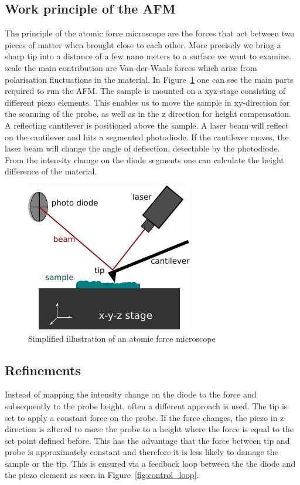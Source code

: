 \documentclass[paper=a4,fontsize=10pt,DIV=18,twocolumn,parskip=half]{scrartcl}
\numberwithin{equation}{section}    %
\newcommand{\figref}[1]{Figure~\ref{fig:#1}}
\begin{document}
\subsection{Work principle of the AFM}
The principle of the atomic force microscope are the forces that act between two 
pieces of matter when brought close to each other. More precisely we bring a 
sharp tip into a distance of a few nano meters to  a surface we want to examine.  
scale the main contribution are Van-der-Waals forces which arise from 
polarisation fluctuations in the material.
In \figref{afm_scheme} one can see the main parts required to run the AFM. 
The sample is mounted on a xyz-stage consisting of different piezo elements. 
This enables us to move the sample in xy-direction for the scanning of the 
probe, as well as in the z direction for height compensation. A reflecting 
cantilever is positioned above the sample. A laser beam will reflect on the 
cantilever and hits a segmented photodiode. If the cantilever moves, the 
laser beam will change the angle of deflection, detectable by the photodiode.
From the intensity change on the diode segments one can calculate the height 
difference of the material.

\begin{figure}
    \centering
    \includegraphics{Bilder/afm_scheme.pdf}
    \caption{Simplified illustration of an atomic force microscope}
    \label{fig:afm_scheme}
\end{figure}

\subsection{Refinements}
Instead of mapping the intensity change on the diode to the force and 
subsequently to the probe height, often a different approach is used. The tip is 
set to apply a constant force on the probe. If the force changes, the piezo in 
z-direction is altered to move the probe to a height where the force is equal to 
the set point defined before. This has the advantage that the force between tip 
and probe is approximately constant and therefore it is less likely to damage 
the sample or the tip. This is ensured via a feedback loop between the the diode 
and the piezo element as seen in \figref{control_loop}.
\end{document}
